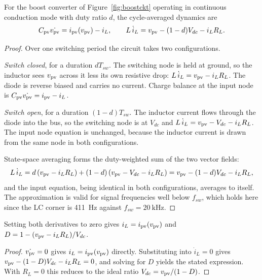 \begin{proposition}
\label{prop:averaging}
For the boost converter of Figure~\ref{fig:boostckt} operating in continuous
conduction mode with duty ratio $d$, the cycle-averaged dynamics are
\[
C_{\mathrm{pv}}\dot{v_{\mathrm{pv}}} = i_{\mathrm{pv}}(v_{\mathrm{pv}}) - i_L,
\qquad
L\,\dot{i}_L = v_{\mathrm{pv}} - (1-d)V_{dc} - i_L R_L .
\]
\end{proposition}

\begin{proof}
Over one switching period the circuit takes two configurations.

\emph{Switch closed}, for a duration $d T_{sw}$. The switching node is held at
ground, so the inductor sees $v_{\mathrm{pv}}$ across it less its own resistive drop:
$L\,\dot{i}_L = v_{\mathrm{pv}} - i_L R_L$. The diode is reverse biased and carries no
current. Charge balance at the input node is
$C_{\mathrm{pv}}\dot{v_{\mathrm{pv}}} = i_{\mathrm{pv}} - i_L$.

\emph{Switch open}, for a duration $(1-d)T_{sw}$. The inductor current flows
through the diode into the bus, so the switching node is at $V_{dc}$ and
$L\,\dot{i}_L = v_{\mathrm{pv}} - V_{dc} - i_L R_L$. The input node equation is unchanged,
because the inductor current is drawn from the same node in both configurations.

State-space averaging forms the duty-weighted sum of the two vector fields:
\[
L\,\dot{i}_L = d\left(v_{\mathrm{pv}} - i_L R_L\right) + (1-d)\left(v_{\mathrm{pv}} - V_{dc} - i_L R_L\right)
= v_{\mathrm{pv}} - (1-d)V_{dc} - i_L R_L,
\]
and the input equation, being identical in both configurations, averages to
itself. The approximation is valid for signal frequencies well below $f_{sw}$,
which holds here since the LC corner is \SI{411}{\hertz} against
$f_{sw} = \SI{20}{\kilo\hertz}$.
\end{proof}

\begin{corollary}
\label{cor:duty}
Setting both derivatives to zero gives $i_L = i_{\mathrm{pv}}(v_{\mathrm{pv}})$ and
$D = 1 - (v_{\mathrm{pv}} - i_L R_L)/V_{dc}$.
\end{corollary}

\begin{proof}
$\dot{v_{\mathrm{pv}}} = 0$ gives $i_L = i_{\mathrm{pv}}(v_{\mathrm{pv}})$ directly. Substituting into
$\dot{i}_L = 0$ gives $v_{\mathrm{pv}} - (1-D)V_{dc} - i_L R_L = 0$, and solving for $D$
yields the stated expression. With $R_L = 0$ this reduces to the ideal ratio
$V_{dc} = v_{\mathrm{pv}}/(1-D)$.
\end{proof}

